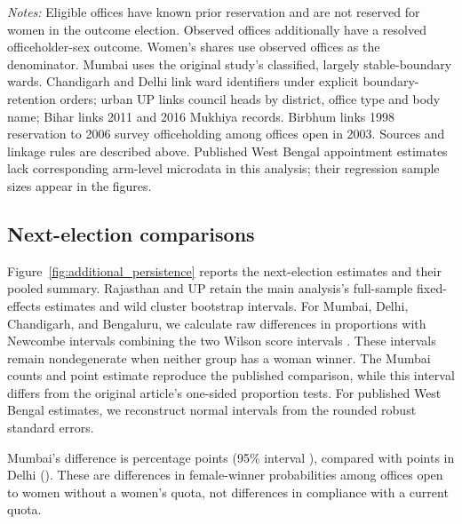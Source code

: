 \begin{table}[!htbp]
\centering
\caption{Samples for the additional microdata comparisons}
\label{tab:additional_samples}
\small
\setlength{\tabcolsep}{3pt}

\begin{minipage}{0.96\textwidth}\small
\emph{Notes:} Eligible offices have known prior reservation and are not reserved for women in the outcome election. Observed offices additionally have a resolved officeholder-sex outcome. Women's shares use observed offices as the denominator. Mumbai uses the original study's classified, largely stable-boundary wards. Chandigarh and Delhi link ward identifiers under explicit boundary-retention orders; urban UP links council heads by district, office type and body name; Bihar links 2011 and 2016 Mukhiya records. Birbhum links 1998 reservation to 2006 survey officeholding among offices open in 2003. Sources and linkage rules are described above. Published West Bengal appointment estimates lack corresponding arm-level microdata in this analysis; their regression sample sizes appear in the figures.
\end{minipage}
\end{table}
\FloatBarrier


\subsection{Next-election comparisons}\label{sec:additional_persistence_results}

Figure~\ref{fig:additional_persistence} reports the next-election estimates and their pooled summary. Rajasthan and UP retain the main analysis's full-sample fixed-effects estimates and wild cluster bootstrap intervals. For Mumbai, Delhi, Chandigarh, and Bengaluru, we calculate raw differences in proportions with Newcombe intervals combining the two Wilson score intervals \citep{newcombe1998difference}. These intervals remain nondegenerate when neither group has a woman winner. The Mumbai counts and point estimate reproduce the published comparison, while this interval differs from the original article's one-sided proportion tests. For published West Bengal estimates, we reconstruct normal intervals from the rounded robust standard errors.

Mumbai's difference is \appMumbaiEstimate{} percentage points (95\% interval \appMumbaiInterval{}), compared with \appDelhiEstimate{} points in Delhi (\appDelhiInterval{}). These are differences in female-winner probabilities among offices open to women without a women's quota, not differences in compliance with a current quota.

